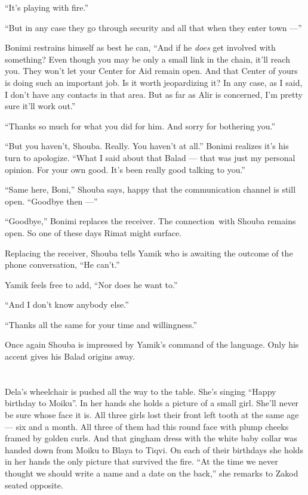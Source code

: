 \documentclass[twoside,11pt,openany]{book}
\begin{document}
``It's playing with fire.''

``But in any case they go through security and all that when they enter town ---''

Bonimi restrains himself as best he can, ``And if he \textit{does} get involved with something? Even though
you may be only a small link in the chain, it'll reach you. They won't let your Center for Aid remain open. And that
Center of yours is doing such an important job. Is it worth jeopardizing it? In any case, as I said, I don't have any
contacts in that area. But as far as Alir is concerned, I'm pretty sure it'll work out.''

``Thanks so much for what you did for him. And sorry for bothering you.''

``But you haven't, Shouba.  Really. You haven't at all.'' Bonimi realizes it's his turn to
apologize. ``What I said about that Balad --- that was just my personal opinion. For your own good. It's
been really good{ }talking to you.''

``Same here, Boni,'' Shouba says, happy that the communication channel is still open.
``Goodbye then ---''

``Goodbye,'' Bonimi replaces the receiver. The connection~with Shouba remains open. So one of
these days Rimat might surface.

Replacing the receiver, Shouba tells Yamik who is awaiting the outcome of the phone conversation, ``He
can't.''

Yamik feels free to add, ``Nor does he want to.''

``And I don't know anybody else.''

``Thanks all the same for your time and willingness.''

Once again Shouba is impressed by Yamik's command of the language.  Only his accent gives his Balad origins away.



\chapter{}

Dela's wheelchair is pushed all the way to the table. She's singing ``Happy birthday to
Moiku''. In her hands she holds a picture of a small girl. She'll never be sure whose face it is. All
three girls lost their front left tooth at the same age --- six and a month. All three of them had this round face with
plump cheeks framed by golden curls. And that gingham dress with the white baby collar was handed down from Moiku to
Blaya to Tiqvi. On each of their birthdays she holds in her hands the only picture that survived the
fire. ``At the time we never thought we should write a name and a date on the back,'' she
remarks to Zakod seated opposite.
\end{document}
